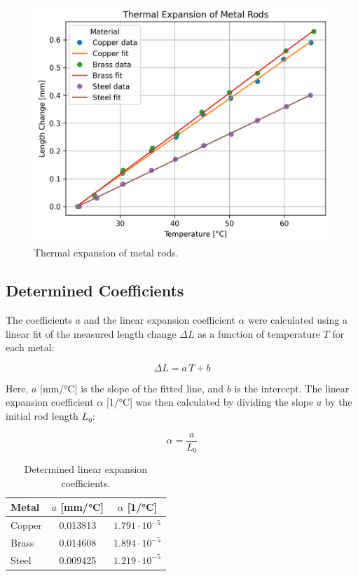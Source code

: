 \documentclass[a4paper,12pt]{article}
\begin{document}
\begin{figure}[h]
    \centering
    \includegraphics[width=1\textwidth]{expansion_plot.png}
    \caption{Thermal expansion of metal rods.}
    \label{fig:expansion_plot}
\end{figure}

\subsection*{Determined Coefficients}

The coefficients $a$ and the linear expansion coefficient $\alpha$ were calculated using a linear fit of the measured length change $\Delta L$ as a function of temperature $T$ for each metal:

\begin{equation}
    \Delta L = a \, T + b
\end{equation}

Here, $a$ [mm/°C] is the slope of the fitted line, and $b$ is the intercept. The linear expansion coefficient $\alpha$ [1/°C] was then calculated by dividing the slope $a$ by the initial rod length $L_0$:

\begin{equation}
    \alpha = \frac{a}{L_0}
\end{equation}

\begin{table}[H]
\centering
\begin{tabular}{l c c}
\toprule
Metal & $a$ [mm/°C] & $\alpha$ [1/°C] \\
\midrule
Copper & 0.013813 & $1.791 \cdot 10^{-5}$ \\
Brass  & 0.014608 & $1.894 \cdot 10^{-5}$ \\
Steel  & 0.009425 & $1.219 \cdot 10^{-5}$ \\
\bottomrule
\end{tabular}
\caption{Determined linear expansion coefficients.}
\end{table}
\end{document}
